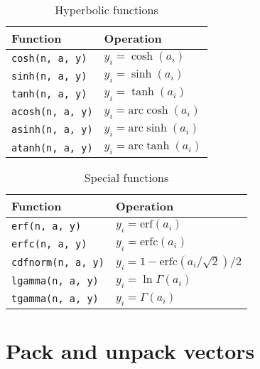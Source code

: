 \begin{table}
  \begin{tabularx}{\textwidth}{XX}
    \toprule
    Function & Operation \\
    \midrule
    \verb|cosh(n, a, y)|  & $y_i = \cosh(a_i)$             \\
    \verb|sinh(n, a, y)|  & $y_i = \sinh(a_i)$             \\
    \verb|tanh(n, a, y)|  & $y_i = \tanh(a_i)$             \\
    \verb|acosh(n, a, y)| & $y_i = \mathrm{arc}\cosh(a_i)$ \\
    \verb|asinh(n, a, y)| & $y_i = \mathrm{arc}\sinh(a_i)$ \\
    \verb|atanh(n, a, y)| & $y_i = \mathrm{arc}\tanh(a_i)$ \\
    \bottomrule
  \end{tabularx}
  \caption{Hyperbolic functions}
  \label{tab:Hyperbolic functions}
\end{table}

\begin{table}
  \begin{tabularx}{\textwidth}{XX}
    \toprule
    Function & Operation \\
    \midrule
    \verb|erf(n, a, y)|     & $y_i = \mathrm{erf}(a_i)$                     \\
    \verb|erfc(n, a, y)|    & $y_i = \mathrm{erfc}(a_i)$                    \\
    \verb|cdfnorm(n, a, y)| & $y_i = 1 - \mathrm{erfc}(a_i / \sqrt{2}) / 2$ \\
    \verb|lgamma(n, a, y)|  & $y_i = \ln\Gamma(a_i)$                        \\
    \verb|tgamma(n, a, y)|  & $y_i = \Gamma(a_i)$                           \\
    \bottomrule
  \end{tabularx}
  \caption{Special functions}
  \label{tab:Special functions}
\end{table}

\section{Pack and unpack vectors}
\label{sec:Pack and unpack vectors}

